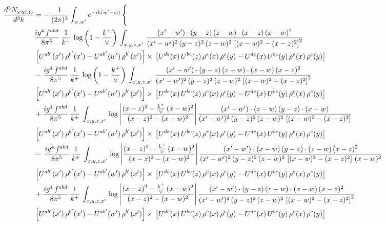 \documentclass[9pt]{article}
\numberwithin{equation}{section}
\begin{document}
\begin{align}
   \frac{d^{3}N_{2\,\rm NLO}^{\rm}}{d^{3}k}  & =  -\,\frac{1}{(2\pi)^{3}}  \int_{w, w^\prime} e^{-ik(w^\prime-w)}\, \Bigg\{\notag \\ &  \frac{ig^{4}\, f^{abd}}{8\pi^{5}}\, \frac{1}{k^{+}}\,\log{\left(1-\frac{k^{+}}{\vee}\right)}\, \int_{x,y,z,x'}\,\frac{(x'-w')\cdot  (y-z)\, (z-w)\cdot (x-z)\, (x-w)^{2}}{(x'-w')^{2}\, (y-z)^{2}\, (z-w)^{2}\,\left[(x-w)^{2}-(x-z)^{2}\right]^{2}}\, \notag \\ & \left[U^{ab'}(x')\,\rho^{b'}(x')-U^{ab'}(w')\, \rho^{b'}(x')\right]\times\,\left[U^{de}(x)\,U^{bc}(z)\, \rho^{e}(x)\,\rho^{c}(y)-U^{de}(x)\,U^{bc}(y)\,\rho^{e}(x)\,\rho^{c}(y)\right] \notag \\ &   - \frac{ig^{4}\, f^{abd}}{8\pi^{5}}\, \frac{1}{k^{+}}\,\log{\left(1-\frac{k^{+}}{\vee}\right)}\, \int_{x,y,z,x'}\,\frac{(x'-w')\cdot  (y-z)\, (z-w)\cdot (x-w)\, (x-z)^{2}}{(x'-w')^{2}\, (y-z)^{2}\, (z-w)^{2}\,\left[(x-w)^{2}-(x-z)^{2}\right]^{2}}\, \notag \\ & \left[U^{ab'}(x')\,\rho^{b'}(x')-U^{ab'}(w')\, \rho^{b'}(x')\right]\times\,\left[U^{de}(x)\,U^{bc}(z)\, \rho^{e}(x)\,\rho^{c}(y)-U^{de}(x)\,U^{bc}(y)\,\rho^{e}(x)\,\rho^{c}(y)\right] \notag \\
&  + \frac{ig^{4}\, f^{abd}}{8\pi^{5}}\, \frac{1}{k^{+}}\, \int_{x,y,z,x'}\,\log{\left|\frac{(x-z)^{2}-\frac{k^{+}}{\vee}\,(x-w)^{2}}{(x-z)^{2}-(x-w)^{2}}\right|}\,\frac{(x'-w')\cdot (z-w)\, (y-z)\cdot (x-w)}{(x'-w')^{2}\, (y-z)^{2}\, (z-w)^{2}\,\left[(x-w)^{2}-(x-z)^{2}\right]}\, \notag \\ & \left[U^{ab'}(x')\,\rho^{b'}(x')-U^{ab'}(w')\, \rho^{b'}(x')\right]\times\,\left[U^{de}(x)\,U^{bc}(z)\, \rho^{e}(x)\,\rho^{c}(y)-U^{de}(x)\,U^{bc}(y)\,\rho^{e}(x)\,\rho^{c}(y)\right] \notag \\
& -\,\frac{ig^{4}\, f^{abd}}{8\pi^{5}}\, \frac{1}{k^{+}}\, \int_{x,y,z,x'}\,\log{\left|\frac{(x-z)^{2}-\frac{k^{+}}{\vee}\,(x-w)^{2}}{(x-z)^{2}-(x-w)^{2}}\right|}\,\frac{(x'-w')\cdot (x-w)\, (y-z)\cdot(z-w)\,(x-z)^{2}}{(x'-w')^{2}\, (y-z)^{2}\, (z-w)^{2}\,\left[(x-w)^{2}-(x-z)^{2}\right]\,(x-w)^{2}}\, \notag \\ & \left[U^{ab'}(x')\,\rho^{b'}(x')-U^{ab'}(w')\, \rho^{b'}(x')\right]\times\,\left[U^{de}(x)\,U^{bc}(z)\, \rho^{e}(x)\,\rho^{c}(y)-U^{de}(x)\,U^{bc}(y)\,\rho^{e}(x)\,\rho^{c}(y)\right] \notag \\
& +\frac{ig^{4}\, f^{abd}}{8\pi^{5}}\, \frac{1}{k^{+}}\, \int_{x,y,z,x'}\,\log{\left|\frac{(x-z)^{2}-\frac{k^{+}}{\vee}\,(x-w)^{2}}{(x-z)^{2}-(x-w)^{2}}\right|}\,\frac{(x'-w')\cdot  (y-z)\, (z-w)\cdot (x-w)\, (x-z)^{2}}{(x'-w')^{2}\, (y-z)^{2}\, (z-w)^{2}\,\left[(x-w)^{2}-(x-z)^{2}\right]^{2}}\, \notag \\ & \left[U^{ab'}(x')\,\rho^{b'}(x')-U^{ab'}(w')\, \rho^{b'}(x')\right]\times\,\left[U^{de}(x)\,U^{bc}(z)\, \rho^{e}(x)\,\rho^{c}(y)-U^{de}(x)\,U^{bc}(y)\,\rho^{e}(x)\,\rho^{c}(y)\right] \notag \\

\end{align}
\end{document}
